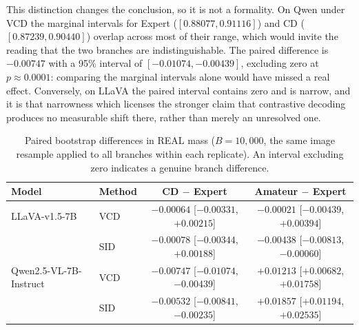 This distinction changes the conclusion, so it is not a formality. On Qwen under
VCD the marginal intervals for Expert ($[0.88077, 0.91116]$) and CD
($[0.87239, 0.90440]$) overlap across most of their range, which would invite the
reading that the two branches are indistinguishable. The paired difference is
$-0.00747$ with a 95\% interval of $[-0.01074, -0.00439]$, excluding zero at
$p \approx 0.0001$: comparing the marginal intervals alone would have missed a
real effect. Conversely, on LLaVA the paired interval contains zero and is narrow,
and it is that narrowness which licenses the stronger claim that contrastive
decoding produces no measurable shift there, rather than merely an unresolved one.

\begin{table}[H]
\centering
\caption{Paired bootstrap differences in REAL mass ($B=10{,}000$, the same image
resample applied to all branches within each replicate). An interval excluding
zero indicates a genuine branch difference.}
\label{tab:bucket_paired_diff}
\setlength{\tabcolsep}{6pt}
\renewcommand{\arraystretch}{1.15}
\begin{tabular}{llcc}
\toprule
\textbf{Model} & \textbf{Method} & \textbf{CD $-$ Expert} & \textbf{Amateur $-$ Expert} \\
\midrule
LLaVA-v1.5-7B & VCD & $-0.00064$ \tiny{[$-0.00331$, $+0.00215$]} & $-0.00021$ \tiny{[$-0.00439$, $+0.00394$]} \\
              & SID & $-0.00078$ \tiny{[$-0.00344$, $+0.00188$]} & $-0.00438$ \tiny{[$-0.00813$, $-0.00060$]} \\
\midrule
Qwen2.5-VL-7B-Instruct & VCD & $-0.00747$ \tiny{[$-0.01074$, $-0.00439$]} & $+0.01213$ \tiny{[$+0.00682$, $+0.01758$]} \\
                       & SID & $-0.00532$ \tiny{[$-0.00841$, $-0.00235$]} & $+0.01857$ \tiny{[$+0.01194$, $+0.02535$]} \\
\bottomrule
\end{tabular}
\end{table}
